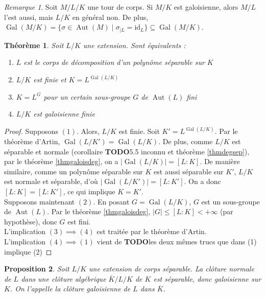 \documentclass{article}
\newcommand{\id}{\mathrm{id}}
\DeclareMathOperator{\Gal}{Gal}
\DeclareMathOperator{\Aut}{Aut}
\newcommand{\todo}{\textbf{TODO}}
\theoremstyle{plain}
\newtheorem{theorem}{Théorème}[subsection]
\newtheorem{proposition}[theorem]{Proposition}
\theoremstyle{definition}
\theoremstyle{remark}
\newtheorem*{remark}{Remarque}
\begin{document}
\begin{remark}
    Soit $M/L/K$ une tour de corps. Si $M/K$ est galoisienne, alors $M/L$ l'est aussi, mais $L/K$ en général non. De plus, $\Gal(M/K) = \{\sigma \in \Aut(M) \mid \sigma_{\mid L} = \id_L \} \subseteq \Gal(M/K)$.
\end{remark}

\begin{theorem}
    Soit $L/K$ une extension. Sont équivalents :
    \begin{enumerate}
        \item $L$ est le corps de décomposition d'un polynôme séparable sur $K$
        \item $L/K$ est finie et $K = L^{\Gal(L/K)}$
        \item $K=L^G$ pour un certain sous-groupe $G$ de $\Aut(L)$ fini
        \item $L/K$ est galoisienne finie
    \end{enumerate}
\end{theorem}

\begin{proof}
    Supposons $(1)$. Alors, $L/K$ est finie. Soit $K' = L^{\Gal(L/K)}$. Par le théorème d'Artin, $\Gal(L/K') = \Gal(L/K)$. De plus, comme $L/K$ est séparable et normale (corollaire \todo 5.5 inconnu et théorème \ref{thmdegsep}), par le théorème \ref{thmgaloisdeg}, on a $|\Gal(L/K)| = [L : K]$. De manière similaire, comme un polynôme séparable sur $K$ est aussi séparable sur $K'$, $L/K$ est normale et séparable, d'où $|\Gal(L/K')| = [L : K']$. On a donc $[L : K] = [L : K']$, ce qui implique $K=K'$. \\
    Supposons maintenant $(2)$. En posant $G = \Gal(L/K)$, $G$ est un sous-groupe de $\Aut(L)$. Par le théorème \ref{thmgaloisdeg}, $|G| \le [L : K] < +\infty$ (par hypothèse), donc $G$ est fini. \\
    L'implication $(3) \implies (4)$ est traitée par le théorème d'Artin. \\
    L'implication $(4) \implies (1)$ vient de \todo les deux mêmes trucs que dans (1) implique (2)
\end{proof}

\begin{proposition}
    Soit $L/K$ une extension de corps séparable. La clôture normale de $L$ dans une clôture algébrique $\overline{K}/L/K$ de $K$ est séparable, donc galoisienne sur $K$. On l'appelle la \emph{clôture galoisienne} de $L$ dans $\overline{K}$.
\end{proposition}
\end{document}
